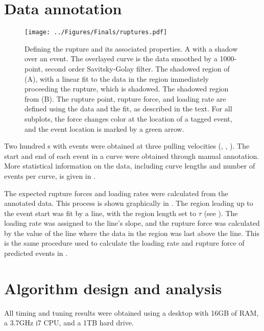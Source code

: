 \section{Data annotation}


\begin{figure}[htpb]
\caption[Definition of rupture force and loading rate]{ Defining the rupture and its associated properties.  A \fec{} with a shadow over an event. The overlayed curve is the data smoothed by a 1000-point, second order Savitsky-Golay filter.  The shadowed region of (A), with a linear fit to the data in the region immediately proceeding the rupture, which is shadowed.  The shadowed region from (B). The rupture point, rupture force, and loading rate are defined using the data and the fit, as described in the text. For all subplots, the force changes color at the location of a tagged event, and the event location is marked by a green arrow. }
\centering
\texttt{[image: ../Figures/Finals/ruptures.pdf]}%
\end{figure}

Two hundred \fec{}s with events were obtained at three pulling velocities (, , ). The start and end of each event in a curve were obtained through manual annotation. More statistical information on the data, including curve lengths and number of events per curve, is given in .

The expected rupture forces and loading rates were calculated from the annotated data. This process is shown graphically in . The region leading up to the event start was fit by a line, with the region length set to $\tau$ (see ). The loading rate was assigned to the line's slope, and the rupture force was calculated by the value of the line where the data in the region was last above the line. This is the same procedure used to calculate the loading rate and rupture force of predicted events in . 



\section{Algorithm design and analysis}

All timing and tuning results were obtained using a desktop with 16GB of RAM, a 3.7GHz i7 CPU, and a 1TB hard drive. 

